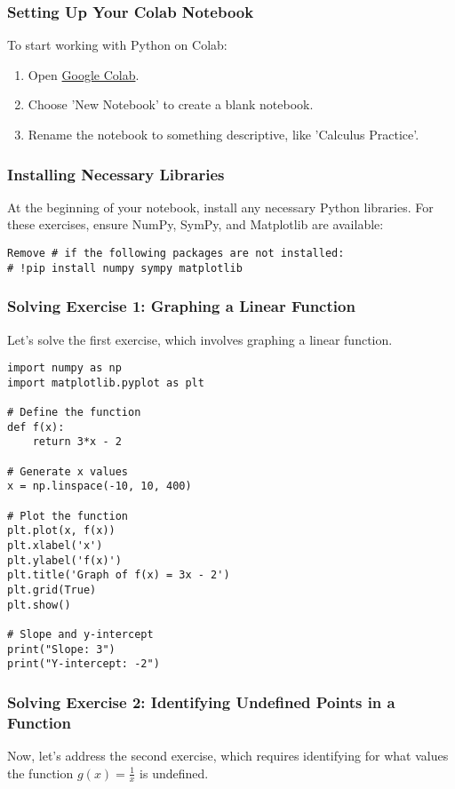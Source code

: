 \documentclass[a4paper,12pt]{book}
\begin{document}
\subsubsection*{Setting Up Your Colab Notebook}
To start working with Python on Colab:

\begin{enumerate}
    \item Open \href{https://colab.research.google.com/}{Google Colab}.
    \item Choose 'New Notebook' to create a blank notebook.
    \item Rename the notebook to something descriptive, like 'Calculus Practice'.
\end{enumerate}

\subsubsection*{Installing Necessary Libraries}
At the beginning of your notebook, install any necessary Python libraries. For these exercises, ensure NumPy, SymPy, and Matplotlib are available:

\begin{verbatim}
Remove # if the following packages are not installed:
# !pip install numpy sympy matplotlib
\end{verbatim}

\subsubsection*{Solving Exercise 1: Graphing a Linear Function}
Let's solve the first exercise, which involves graphing a linear function.

\begin{verbatim}
import numpy as np
import matplotlib.pyplot as plt

# Define the function
def f(x):
    return 3*x - 2

# Generate x values
x = np.linspace(-10, 10, 400)

# Plot the function
plt.plot(x, f(x))
plt.xlabel('x')
plt.ylabel('f(x)')
plt.title('Graph of f(x) = 3x - 2')
plt.grid(True)
plt.show()

# Slope and y-intercept
print("Slope: 3")
print("Y-intercept: -2")
\end{verbatim}

\subsubsection*{Solving Exercise 2: Identifying Undefined Points in a Function}
Now, let's address the second exercise, which requires identifying for what values the function \( g(x) = \frac{1}{x} \) is undefined.
\end{document}

